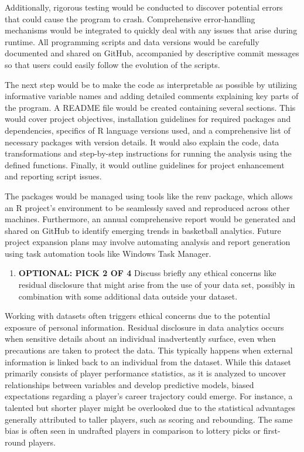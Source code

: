\documentclass[
]{article}
\providecommand{\tightlist}{%
  \setlength{\itemsep}{0pt}\setlength{\parskip}{0pt}}
\begin{document}
Additionally, rigorous testing would be conducted to discover potential
errors that could cause the program to crash. Comprehensive
error-handling mechanisms would be integrated to quickly deal with any
issues that arise during runtime. All programming scripts and data
versions would be carefully documented and shared on GitHub, accompanied
by descriptive commit messages so that users could easily follow the
evolution of the scripts.

The next step would be to make the code as interpretable as possible by
utilizing informative variable names and adding detailed comments
explaining key parts of the program. A README file would be created
containing several sections. This would cover project objectives,
installation guidelines for required packages and dependencies,
specifics of R language versions used, and a comprehensive list of
necessary packages with version details. It would also explain the code,
data transformations and step-by-step instructions for running the
analysis using the defined functions. Finally, it would outline
guidelines for project enhancement and reporting script issues.

The packages would be managed using tools like the renv package, which
allows an R project's environment to be seamlessly saved and reproduced
across other machines. Furthermore, an annual comprehensive report would
be generated and shared on GitHub to identify emerging trends in
basketball analytics. Future project expansion plans may involve
automating analysis and report generation using task automation tools
like Windows Task Manager.

\vspace{2cm}
\newpage

\begin{enumerate}
\def\labelenumi{\arabic{enumi})}
\setcounter{enumi}{7}
\tightlist
\item
  \textbf{OPTIONAL: PICK 2 OF 4} Discuss briefly any ethical concerns
  like residual disclosure that might arise from the use of your data
  set, possibly in combination with some additional data outside your
  dataset.
\end{enumerate}

Working with datasets often triggers ethical concerns due to the
potential exposure of personal information. Residual disclosure in data
analytics occurs when sensitive details about an individual
inadvertently surface, even when precautions are taken to protect the
data. This typically happens when external information is linked back to
an individual from the dataset. While this dataset primarily consists of
player performance statistics, as it is analyzed to uncover
relationships between variables and develop predictive models, biased
expectations regarding a player's career trajectory could emerge. For
instance, a talented but shorter player might be overlooked due to the
statistical advantages generally attributed to taller players, such as
scoring and rebounding. The same bias is often seen in undrafted players
in comparison to lottery picks or first-round players.
\end{document}
